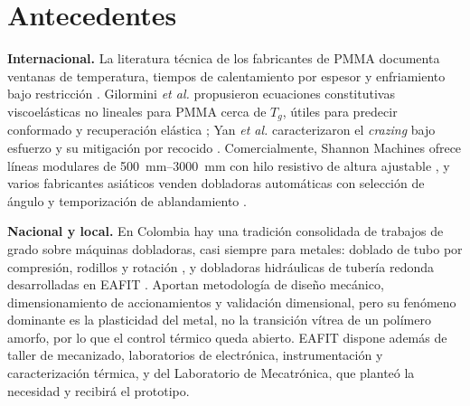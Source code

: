 \section{Antecedentes}

\noindent\textbf{Internacional.} La literatura técnica de los fabricantes de PMMA documenta ventanas de temperatura, tiempos de calentamiento por espesor y enfriamiento bajo restricción \cite{plexiglas_forming,throne2008}. Gilormini \emph{et al.} propusieron ecuaciones constitutivas viscoelásticas no lineales para PMMA cerca de $T_g$, útiles para predecir conformado y recuperación elástica \cite{gilormini2010}; Yan \emph{et al.} caracterizaron el \emph{crazing} bajo esfuerzo y su mitigación por recocido \cite{yan2023}. Comercialmente, Shannon Machines ofrece líneas modulares de \SIrange{500}{3000}{\milli\meter} con hilo resistivo de altura ajustable \cite{shannon_line,shannon_bending}, y varios fabricantes asiáticos venden dobladoras automáticas con selección de ángulo y temporización de ablandamiento \cite{mic_auto}.

\noindent\textbf{Nacional y local.} En Colombia hay una tradición consolidada de trabajos de grado sobre máquinas dobladoras, casi siempre para metales: doblado de tubo por compresión, rodillos y rotación \cite{uniandes2003}, y dobladoras hidráulicas de tubería redonda desarrolladas en EAFIT \cite{eafit_hidraulica}. Aportan metodología de diseño mecánico, dimensionamiento de accionamientos y validación dimensional, pero su fenómeno dominante es la plasticidad del metal, no la transición vítrea de un polímero amorfo, por lo que el control térmico queda abierto. EAFIT dispone además de taller de mecanizado, laboratorios de electrónica, instrumentación y caracterización térmica, y del Laboratorio de Mecatrónica, que planteó la necesidad y recibirá el prototipo.
